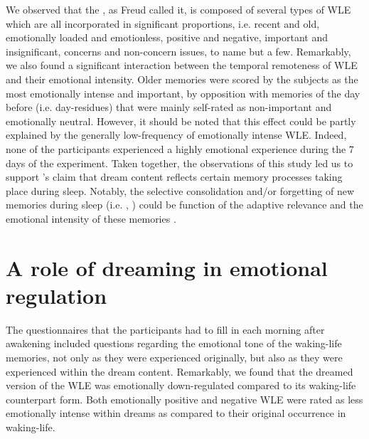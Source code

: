 We observed that the , as Freud called it, is composed of several types of WLE which are all incorporated in significant proportions, i.e. recent and old, emotionally loaded and emotionless, positive and negative, important and insignificant, concerns and non-concern issues, to name but a few. Remarkably, we also found a significant interaction between the temporal remoteness of WLE and their emotional intensity. Older memories were scored by the subjects as the most emotionally intense and important, by opposition with memories of the day before (i.e. day-residues) that were mainly self-rated as non-important and emotionally neutral. However, it should be noted that this effect could be partly explained by the generally low-frequency of emotionally intense WLE. Indeed, none of the participants experienced a highly emotional experience during the 7 days of the experiment. Taken together, the observations of this study led us to support \citet{payne_sleep_2004}'s claim that dream content reflects certain memory processes taking place during sleep. Notably, the selective consolidation and/or forgetting of new memories during sleep (i.e. , \citealp{stickgold_sleep-dependent_2013}) could be function of the adaptive relevance and the emotional intensity of these memories \citep{schwartz_are_2003, malinowski_memory_2014, saletin_role_2011}.

\section{A role of dreaming in emotional regulation}
\label{disc:drf:summary:regulation}

The questionnaires that the participants had to fill in each morning after awakening included questions regarding the emotional tone of the waking-life memories, not only as they were experienced originally, but also as they were experienced within the dream content. Remarkably, we found that the dreamed version of the WLE was emotionally down-regulated compared to its waking-life counterpart form. Both emotionally positive and negative WLE were rated as less emotionally intense within dreams as compared to their original occurrence in waking-life.

